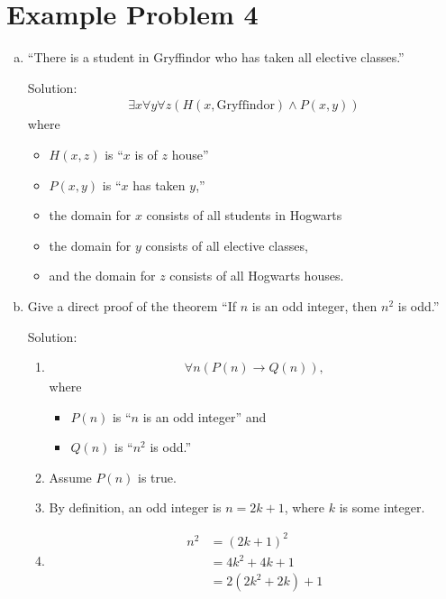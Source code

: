 \documentclass[12pt,letterpaper]{article}
\begin{document}
\section*{Example Problem 4}
\begin{enumerate}[a)]
    \item 
    ``There is a student in Gryffindor who has taken all elective classes.''
    
    Solution:
        \begin{align*}
            \exists x \forall y \forall z ( H(x, \text{Gryffindor}) \wedge P(x,y) )
        \end{align*}
    where 
    \begin{itemize}
        \item[] $H(x,z)$ is ``$x$ is of $z$ house''
        \item[] $P(x, y)$ is ``$x$ has taken $y$,''
        \item[] the domain for $x$ consists of all students in Hogwarts
        \item[] the domain for $y$ consists of all elective classes,
        \item[] and the domain for $z$ consists of all Hogwarts houses.
    \end{itemize}
    
    \item 
    Give a direct proof of the theorem ``If $n$ is an odd integer, then $n^2$ is odd.''
    
    Solution:
    \begin{enumerate}[1.]
        \item 
        \begin{align*}
            \forall n(P(n) \rightarrow Q(n)),
        \end{align*}
       where
       \begin{itemize}
            \item[] $P(n)$ is ``$n$ is an odd integer'' and
            \item[] $Q(n)$ is ``$n^2$ is odd.''
       \end{itemize}
        
        \item 
        Assume $P(n)$  is true.
        
        \item 
        By definition, an odd integer is $n = 2k + 1$, 
        where $k$ is some integer.

        \item
        \begin{align*}
            n^2 &= (2k + 1)^2 \\
                &= 4k^2 + 4k + 1 \\
                &=  2(2k^2 + 2k) + 1
        \end{align*}
        

\end{enumerate}
\end{enumerate}
\end{document}
